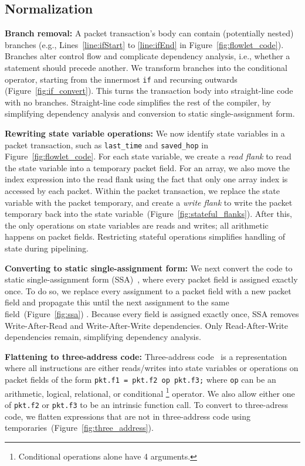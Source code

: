 \subsection{Normalization}
\label{ss:normalization}

\textbf{Branch removal: }A packet transaction's body can contain (potentially
nested) branches (e.g., Lines~\ref{line:ifStart} to \ref{line:ifEnd} in
Figure~\ref{fig:flowlet_code}).  Branches alter control flow and complicate
dependency analysis, i.e.,  whether a statement should precede another.  We
transform branches into the conditional operator, starting from the innermost
\texttt{if} and recursing outwards (Figure~\ref{fig:if_convert}).  This turns
the transaction body into straight-line code with no branches.  Straight-line
code simplifies the rest of the compiler, by simplifying dependency analysis
and conversion to static single-assignment form.

\textbf{Rewriting state variable operations: }We now identify state variables
in a packet transaction, such as \texttt{last\_time} and \texttt{saved\_hop} in
Figure~\ref{fig:flowlet_code}.  For each state variable, we create a
\textit{read flank} to read the state variable into a temporary packet field.
For an array, we also move the index expression into the read flank using the
fact that only one array index is accessed by each packet.  Within the packet
transaction, we replace the state variable with the packet temporary, and
create a \textit{write flank} to write the packet temporary back into the state
variable~(Figure~\ref{fig:stateful_flanks}). After this, the only operations
on state variables are reads and writes; all arithmetic happens on packet
fields. Restricting stateful operations simplifies handling of state during
pipelining.

\textbf{Converting to static single-assignment form: }We next convert the code to
static single-assignment form (SSA)~\cite{ssa}, where every packet field is
assigned exactly once. To do so, we replace every assignment to a packet field
with a new packet field and propagate this until the next assignment to the
same field~(Figure~\ref{fig:ssa}) .  Because every field is assigned exactly
once, SSA removes Write-After-Read and Write-After-Write dependencies.  Only
Read-After-Write dependencies remain, simplifying dependency analysis.

\textbf{Flattening to three-address code: } Three-address code~\cite{tac} is a
representation where all instructions are either reads/writes into state
variables or operations on packet fields of the form \texttt{pkt.f1 = pkt.f2 op
pkt.f3;} where \texttt{op} can be an arithmetic, logical, relational, or conditional
\footnote{Conditional operations alone have 4 arguments.} operator.  We also allow either one of {\tt pkt.f2} or {\tt pkt.f3}
to be an intrinsic function call.  To convert to three-adress code, we flatten
expressions that are not in three-address code using
temporaries~(Figure~\ref{fig:three_address}).

